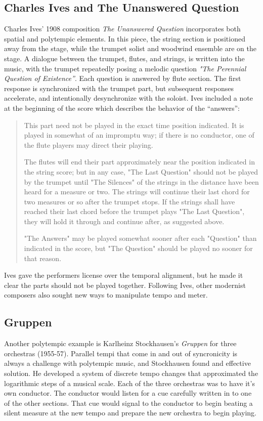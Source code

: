 \subsection{Charles Ives and The Unanswered Question}
\label{sec:Charles Ives}
Charles Ives' 1908 composition \textit{The Unanswered Question}
incorporates both spatial and polytempic elements. In this piece, the
string section is positioned away from the stage, while the trumpet
solist and woodwind ensemble are on the stage. A dialogue between the
trumpet, flutes, and strings, is written into the music, with the
trumpet repeatedly posing a melodic question \textit{"The Perennial
  Question of Existence''}. Each question is answered by flute
section. The first response is synchronized with the trumpet part, but
subsequent responses accelerate, and intentionally desynchronize with
the soloist. Ives included a note at the beginning of the score which
describes the behavior of the ``answers'':
\begin{quotation}
This part need not be played in the exact time position indicated. It
is played in somewhat of an impromptu way; if there is no conductor,
one of the flute players may direct their playing.

The flutes will end their part approximately near the position
indicated in the string score; but in any case, "The Last Question"
should not be played by the trumpet until "The Silences" of the
strings in the distance have been heard for a measure or two. The
strings will continue their last chord for two measures or so after
the trumpet stops. If the strings shall have reached their last chord
before the trumpet plays "The Last Question", they will hold it
through and continue after, as suggested above.

"The Answers" may be played somewhat sooner after each "Question" than
indicated in the score, but "The Question" should be played no sooner
for that reason.
\end{quotation}
Ives gave the performers license over the temporal alignment, but he
made it clear the parts should not be played together. Following Ives,
other modernist composers also sought new ways to manipulate tempo and
meter. 

\subsection{Gruppen}
\label{sec:gruppen}
Another polytempic example is Karlheinz Stockhausen's \textit{Gruppen}
for three orchestras (1955-57). Parallel tempi that come in and out of
syncronicity is always a challenge with polytempic music, and
Stockhausen found and effective solution. He developed a system of
discrete tempo changes that approximated the logarithmic steps of a
musical scale. Each of the three orchestras was to have it's own
conductor. The conductor would listen for a cue carefully written in
to one of the other sections. That cue would signal to the conductor
to begin beating a silent measure at the new tempo and prepare the new
orchestra to begin playing.


